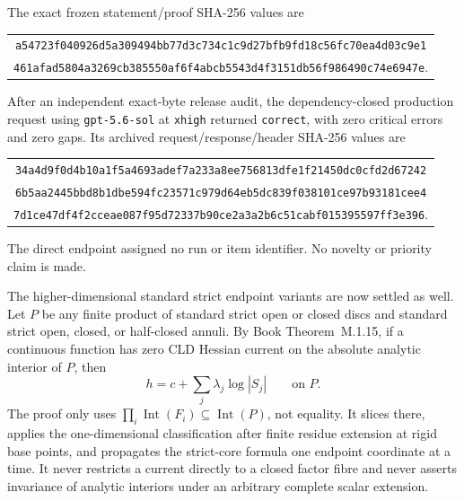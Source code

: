 \documentclass[11pt,a4paper]{article}
\theoremstyle{definition}
\theoremstyle{remark}
\begin{document}
The exact frozen statement/proof SHA-256 values are
\begin{center}
\small
\begin{tabular}{@{}c@{}}
\nolinkurl{a54723f040926d5a309494bb77d3c734c1c9d27bfb9fd18c56fc70ea4d03c9e1}\\
\nolinkurl{461afad5804a3269cb385550af6f4abcb5543d4f3151db56f986490c74e6947e}.
\end{tabular}
\end{center}
After an independent exact-byte release audit, the dependency-closed
production request using \texttt{gpt-5.6-sol} at \texttt{xhigh} returned
\texttt{correct}, with zero critical errors and zero gaps.  Its archived
request/response/header SHA-256 values are
\begin{center}
\small
\begin{tabular}{@{}c@{}}
\nolinkurl{34a4d9f0d4b10a1f5a4693adef7a233a8ee756813dfe1f21450dc0cfd2d67242}\\
\nolinkurl{6b5aa2445bbd8b1dbe594fc23571c979d64eb5dc839f038101ce97b93181cee4}\\
\nolinkurl{7d1ce47df4f2cceae087f95d72337b90ce2a3a2b6c51cabf015395597ff3e396}.
\end{tabular}
\end{center}
The direct endpoint assigned no run or item identifier.  No novelty or
priority claim is made.

The higher-dimensional standard strict endpoint variants are now settled as
well.  Let \(P\) be any finite product of standard strict open or closed
discs and standard strict open, closed, or half-closed annuli.  By
Book Theorem~M.1.15, if a continuous function
has zero CLD Hessian current on the absolute analytic interior of \(P\), then
\[
                         h=c+\sum_j\lambda_j\log|S_j|
                         \qquad\text{on }P.
\]
The proof only uses
\(
 \prod_i\operatorname{Int}(F_i)\subseteq\operatorname{Int}(P)
\), not equality.  It slices there, applies the one-dimensional
classification after finite residue extension at rigid base points, and
propagates the strict-core formula one endpoint coordinate at a time.  It
never restricts a current directly to a closed factor fibre and never
asserts invariance of analytic interiors under an arbitrary complete scalar
extension.
\end{document}
